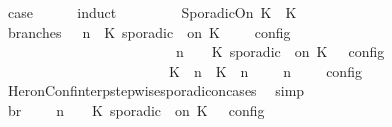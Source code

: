 \begin{isabellebody}
\ {\isacharquery}case\isanewline
\ \ \ \ \isamarkupfalse%
\ {\isacharparenleft}induct\ {\isasympsi}{\isacharparenright}\isanewline
\ \ \ \ \ \ \isamarkupfalse%
\ {\isacharparenleft}SporadicOn\ K\ {\isasymtau}\ K\isanewline
\ \ \ \ \ \ \ \ \isamarkupfalse%
\ branches{\isacharcolon}\ {\isacartoucheopen}{\isasymlbrakk}\ {\isasymGamma}{\isacharcomma}\ n\ {\isasymturnstile}\ {\isacharparenleft}{\isacharparenleft}K\ sporadic\ {\isasymtau}\ on\ K\ {\isacharhash}\ {\isasymPsi}{\isacharparenright}\ {\isasymtriangleright}\ {\isasymPhi}\ {\isasymrbrakk}\isactrlsub c\isactrlsub o\isactrlsub n\isactrlsub f\isactrlsub i\isactrlsub g\isanewline
\ \ \ \ \ \ \ \ \ \ \ \ \ \ \ \ \ \ \ \ \ \ {\isacharequal}\ {\isasymlbrakk}\ {\isasymGamma}{\isacharcomma}\ n\ {\isasymturnstile}\ {\isasymPsi}\ {\isasymtriangleright}\ {\isacharparenleft}{\isacharparenleft}K\ sporadic\ {\isasymtau}\ on\ K\ {\isacharhash}\ {\isasymPhi}{\isacharparenright}\ {\isasymrbrakk}\isactrlsub c\isactrlsub o\isactrlsub n\isactrlsub f\isactrlsub i\isactrlsub g\isanewline
\ \ \ \ \ \ \ \ \ \ \ \ \ \ \ \ \ \ \ \ \ \ {\isasymunion}\ {\isasymlbrakk}\ {\isacharparenleft}{\isacharparenleft}K\ {\isasymUp}\ n{\isacharparenright}\ {\isacharhash}\ {\isacharparenleft}K\ {\isasymDown}\ n\ {\isacharat}\ {\isasymtau}{\isacharparenright}\ {\isacharhash}\ {\isasymGamma}{\isacharparenright}{\isacharcomma}\ n\ {\isasymturnstile}\ {\isasymPsi}\ {\isasymtriangleright}\ {\isasymPhi}\ {\isasymrbrakk}\isactrlsub c\isactrlsub o\isactrlsub n\isactrlsub f\isactrlsub i\isactrlsub g{\isacartoucheclose}\isanewline
\ \ \ \ \ \ \ \ \ \ \isamarkupfalse%
\ HeronConf{\isacharunderscore}interp{\isacharunderscore}stepwise{\isacharunderscore}sporadicon{\isacharunderscore}cases\ \isamarkupfalse%
\ simp\isanewline
\ \ \ \ \ \ \ \ \isamarkupfalse%
\ br{}{\isacharcolon}\ {\isacartoucheopen}{\isasymrho}\ {\isasymin}\ {\isasymlbrakk}\ {\isasymGamma}{\isacharcomma}\ n\ {\isasymturnstile}\ {\isasymPsi}\ {\isasymtriangleright}\ {\isacharparenleft}{\isacharparenleft}K\ sporadic\ {\isasymtau}\ on\ K\ {\isacharhash}\ {\isasymPhi}{\isacharparenright}\ {\isasymrbrakk}\isactrlsub c\isactrlsub o\isactrlsub n\isactrlsub f\isactrlsub i\isactrlsub g\isanewline

\end{isabellebody}
